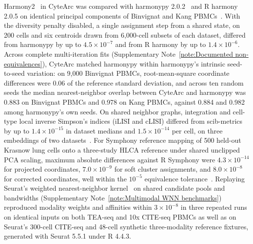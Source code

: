 Harmony2~\cite{korsunsky2019,patikas2026integration} in CyteArc was compared with harmonypy 2.0.2~\cite{slowikowski2026slowkowharmonypy} and R harmony 2.0.5 on identical principal components of Binvignat and Kang PBMCs~\cite{binvignat2024,kang2018}. With the diversity penalty disabled, a single assignment step from a shared state, on 200 cells and six centroids drawn from 6,000-cell subsets of each dataset, differed from harmonypy by up to $4.5\times 10^{-7}$ and from R harmony by up to $1.4\times 10^{-6}$. Across complete multi-iteration fits (Supplementary Note~\ref{note:Documented non-equivalences}), CyteArc matched harmonypy within harmonypy's intrinsic seed-to-seed variation: on 9,000 Binvignat PBMCs, root-mean-square coordinate differences were 0.06 of the reference standard deviation, and across ten random seeds the median nearest-neighbor overlap between CyteArc and harmonypy was 0.883 on Binvignat PBMCs and 0.978 on Kang PBMCs, against 0.884 and 0.982 among harmonypy's own seeds. On shared neighbor graphs, integration and cell-type local inverse Simpson's indices (iLISI and cLISI) differed from scib-metrics by up to $1.4\times 10^{-15}$ in dataset medians and $1.5\times 10^{-14}$ per cell, on three embeddings of two datasets~\cite{luecken2022}. For Symphony reference mapping of 500 held-out Krasnow lung cells onto a three-study HLCA reference under shared unclipped PCA scaling, maximum absolute differences against R Symphony were $4.3\times 10^{-14}$ for projected coordinates, $7.0\times 10^{-9}$ for soft cluster assignments, and $8.0\times 10^{-8}$ for corrected coordinates, well within the $10^{-5}$ equivalence tolerance~\cite{kang2021,travaglini2020molecular,sikkema2023}. Replaying Seurat's weighted nearest-neighbor kernel~\cite{hao2021} on shared candidate pools and bandwidths (Supplementary Note~\ref{note:Multimodal WNN benchmarks}) reproduced modality weights and affinities within $3\times 10^{-8}$ in three repeated runs on identical inputs on both TEA-seq and 10x CITE-seq PBMCs as well as on Seurat's 300-cell CITE-seq and 48-cell synthetic three-modality reference fixtures, generated with Seurat 5.5.1 under R 4.4.3.

\label{note:Droplet, hashtag and regulatory agreement}

